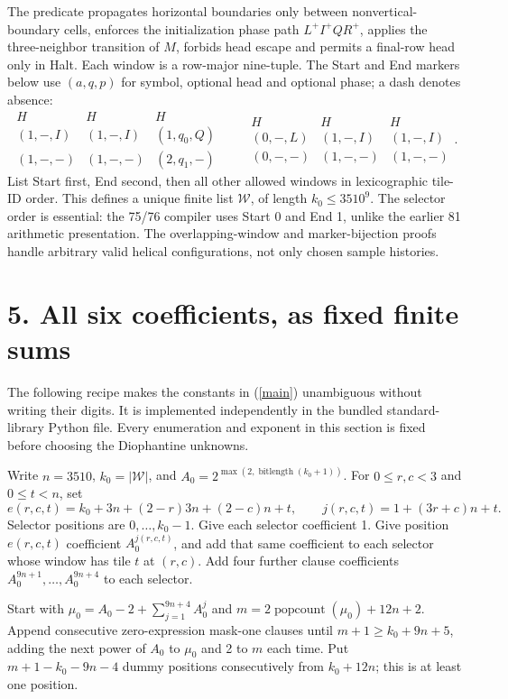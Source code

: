 \documentclass[10pt]{article}
\begin{document}
The predicate propagates horizontal boundaries only between nonvertical-boundary cells, enforces the initialization phase path $L^+I^+QR^+$, applies the three-neighbor transition of $M$, forbids head escape and permits a final-row head only in Halt. Each window is a row-major nine-tuple. The Start and End markers below use $(a,q,p)$ for symbol, optional head and optional phase; a dash denotes absence:
\[
\begin{array}{ccc}H&H&H\\(1,-,I)&(1,-,I)&(1,q_0,Q)\\(1,-,-)&(1,-,-)&(2,q_1,-)\end{array}
\qquad
\begin{array}{ccc}H&H&H\\(0,-,L)&(1,-,I)&(1,-,I)\\(0,-,-)&(1,-,-)&(1,-,-)\end{array}.
\]
List Start first, End second, then all other allowed windows in lexicographic tile-ID order. This defines a unique finite list $\mathcal W$, of length $k_0\le3510^9$. The selector order is essential: the 75/76 compiler uses Start 0 and End 1, unlike the earlier 81 arithmetic presentation. The overlapping-window and marker-bijection proofs handle arbitrary valid helical configurations, not only chosen sample histories.
\newpage
\section*{5. All six coefficients, as fixed finite sums}
The following recipe makes the constants in (\ref{main}) unambiguous without writing their digits. It is implemented independently in the bundled standard-library Python file. Every enumeration and exponent in this section is fixed before choosing the Diophantine unknowns.

Write $n=3510$, $k_0=|\mathcal W|$, and
$A_0=2^{\max(2,\operatorname{bitlength}(k_0+1))}$. For $0\le r,c<3$ and $0\le t<n$, set
\[
e(r,c,t)=k_0+3n+(2-r)3n+(2-c)n+t,\qquad j(r,c,t)=1+(3r+c)n+t.
\]
Selector positions are $0,\ldots,k_0-1$. Give each selector coefficient 1. Give position $e(r,c,t)$ coefficient $A_0^{j(r,c,t)}$, and add that same coefficient to each selector whose window has tile $t$ at $(r,c)$. Add four further clause coefficients $A_0^{9n+1},\ldots,A_0^{9n+4}$ to each selector.

Start with $\mu_0=A_0-2+\sum_{j=1}^{9n+4}A_0^j$ and
$m=2\operatorname{popcount}(\mu_0)+12n+2$. Append consecutive zero-expression mask-one clauses until $m+1\ge k_0+9n+5$, adding the next power of $A_0$ to $\mu_0$ and 2 to $m$ each time. Put $m+1-k_0-9n-4$ dummy positions consecutively from $k_0+12n$; this is at least one position.
\end{document}
